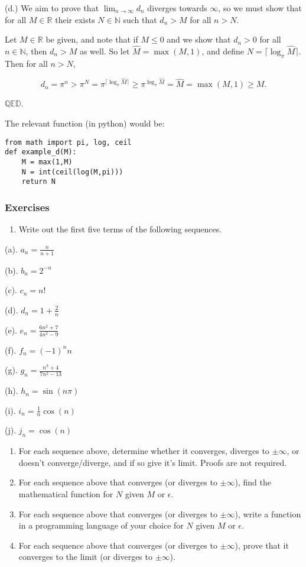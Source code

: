 \documentclass[]{article}
\begin{document}
(d.) We aim to prove that $\lim_{n \to \infty} d_n$ diverges towards
$\infty$, so we must show that for all $M \in \mathbb{R}$ their exists
$N \in \mathbb{N}$ such that $d_n > M$ for all $n > N$.

Let $M \in \mathbb{R}$ be given, and note that if $M \le 0$ and we show
that $d_n > 0$ for all $n \in \mathbb{N}$, then $d_n > M$ as well. So
let $\hat{M} = \max(M,1)$, and define
$N = \lceil \log_{\pi} \hat{M} \rceil $. Then for all $n > N$,

\[ d_n = \pi^n > \pi^N = \pi^{\lceil \log_{\pi} \hat{M} \rceil} \ge \pi^{ \log_{\pi} \hat{M} } = \hat{M} =  \max(M,1) \ge M. \]

$\mathbb{QED}$.

The relevant function (in python) would be:

\begin{verbatim}
from math import pi, log, ceil
def example_d(M):
    M = max(1,M)
    N = int(ceil(log(M,pi)))
    return N
\end{verbatim}

\subsubsection{Exercises}

\begin{enumerate}
\def\labelenumi{(\arabic{enumi})}
\itemsep1pt\parskip0pt
\item
  Write out the first five terms of the following sequences.
\end{enumerate}

(a). $a_n  = \frac{n}{n+1}$

(b). $b_n = 2^{-n}$

(c). $c_n = n!$

(d). $d_n = 1 + \frac{2}{n}$

(e). $e_n = \frac{6n^2+7}{4n^2 - 9}$

(f). $f_n = (-1)^n n$

(g). $g_n = \frac{n^3+4}{7n^2 - 13}$

(h). $h_n = \sin(n \pi)$

(i). $i_n = \frac{1}{n} \cos(n)$

(j). $j_n = \cos(n)$

\begin{enumerate}
\def\labelenumi{(\arabic{enumi})}
\setcounter{enumi}{1}
\item
  For each sequence above, determine whether it converges, diverges to
  $\pm \infty$, or doesn't converge/diverge, and if so give it's limit.
  Proofs are not required.
\item
  For each sequence above that converges (or diverges to $\pm \infty$),
  find the mathematical function for $N$ given $M$ or $\epsilon$.
\item
  For each sequence above that converges (or diverges to $\pm \infty$),
  write a function in a programming language of your choice for $N$
  given $M$ or $\epsilon$.
\item
  For each sequence above that converges (or diverges to $\pm \infty$),
  prove that it converges to the limit (or diverges to $\pm \infty$).
\end{enumerate}
\end{document}
